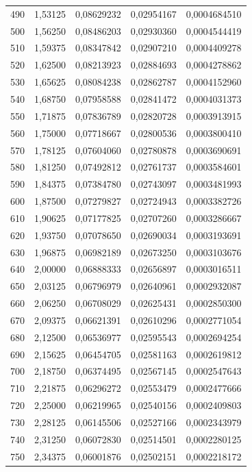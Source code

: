 \begin{longtable}{rrrrr}
490 & 1,53125 & 0,08629232 & 0,02954167 & 0,0004684510\\
500 & 1,56250 & 0,08486203 & 0,02930360 & 0,0004544419\\
510 & 1,59375 & 0,08347842 & 0,02907210 & 0,0004409278\\
520 & 1,62500 & 0,08213923 & 0,02884693 & 0,0004278862\\
530 & 1,65625 & 0,08084238 & 0,02862787 & 0,0004152960\\
540 & 1,68750 & 0,07958588 & 0,02841472 & 0,0004031373\\
550 & 1,71875 & 0,07836789 & 0,02820728 & 0,0003913915\\
560 & 1,75000 & 0,07718667 & 0,02800536 & 0,0003800410\\
570 & 1,78125 & 0,07604060 & 0,02780878 & 0,0003690691\\
580 & 1,81250 & 0,07492812 & 0,02761737 & 0,0003584601\\
590 & 1,84375 & 0,07384780 & 0,02743097 & 0,0003481993\\
600 & 1,87500 & 0,07279827 & 0,02724943 & 0,0003382726\\
610 & 1,90625 & 0,07177825 & 0,02707260 & 0,0003286667\\
620 & 1,93750 & 0,07078650 & 0,02690034 & 0,0003193691\\
630 & 1,96875 & 0,06982189 & 0,02673250 & 0,0003103676\\
640 & 2,00000 & 0,06888333 & 0,02656897 & 0,0003016511\\
650 & 2,03125 & 0,06796979 & 0,02640961 & 0,0002932087\\
660 & 2,06250 & 0,06708029 & 0,02625431 & 0,0002850300\\
670 & 2,09375 & 0,06621391 & 0,02610296 & 0,0002771054\\
680 & 2,12500 & 0,06536977 & 0,02595543 & 0,0002694254\\
690 & 2,15625 & 0,06454705 & 0,02581163 & 0,0002619812\\
700 & 2,18750 & 0,06374495 & 0,02567145 & 0,0002547643\\
710 & 2,21875 & 0,06296272 & 0,02553479 & 0,0002477666\\
720 & 2,25000 & 0,06219965 & 0,02540156 & 0,0002409803\\
730 & 2,28125 & 0,06145506 & 0,02527166 & 0,0002343979\\
740 & 2,31250 & 0,06072830 & 0,02514501 & 0,0002280125\\
750 & 2,34375 & 0,06001876 & 0,02502151 & 0,0002218172\\

\end{longtable}
